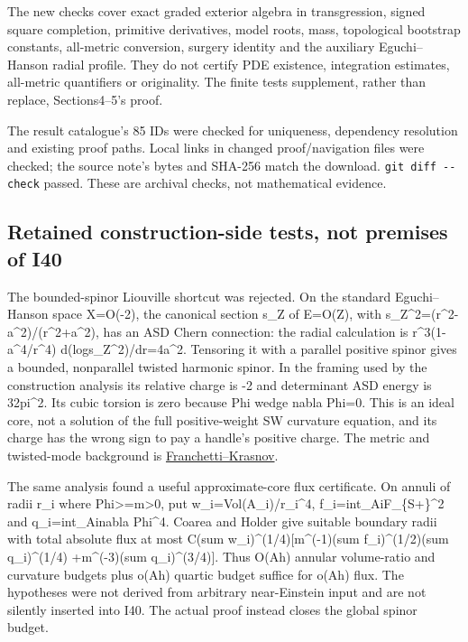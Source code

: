 \documentclass[
  10pt,
]{article}
\begin{document}
The new checks cover exact graded exterior algebra in transgression,
signed square completion, primitive derivatives, model roots, mass,
topological bootstrap constants, all-metric conversion, surgery identity
and the auxiliary Eguchi--Hanson radial profile. They do not certify PDE
existence, integration estimates, all-metric quantifiers or originality.
The finite tests supplement, rather than replace, Sections4--5's proof.

The result catalogue's 85 IDs were checked for uniqueness, dependency
resolution and existing proof paths. Local links in changed
proof/navigation files were checked; the source note's bytes and SHA-256
match the download. \texttt{git\ diff\ -\/-check} passed. These are
archival checks, not mathematical evidence.

\hypertarget{retained-construction-side-tests-not-premises-of-i40}{%
\subsection{Retained construction-side tests, not premises of
I40}\label{retained-construction-side-tests-not-premises-of-i40}}

The bounded-spinor Liouville shortcut was rejected. On the standard
Eguchi--Hanson space X=O(-2), the canonical section s\_Z of E=O(Z), with
\textbar s\_Z\textbar\^{}2=(r\^{}2-a\^{}2)/(r\^{}2+a\^{}2), has an ASD
Chern connection: the radial calculation is r\^{}3(1-a\^{}4/r\^{}4)
d(log\textbar s\_Z\textbar\^{}2)/dr=4a\^{}2. Tensoring it with a
parallel positive spinor gives a bounded, nonparallel twisted harmonic
spinor. In the framing used by the construction analysis its relative
charge is -2 and determinant ASD energy is 32pi\^{}2. Its cubic torsion
is zero because Phi wedge nabla Phi=0. This is an ideal core, not a
solution of the full positive-weight SW curvature equation, and its
charge has the wrong sign to pay a handle's positive charge. The metric
and twisted-mode background is
\href{https://arxiv.org/abs/2309.08453}{Franchetti--Krasnov}.

The same analysis found a useful approximate-core flux certificate. On
annuli of radii r\_i where
\textbar Phi\textbar\textgreater=m\textgreater0, put
w\_i=Vol(A\_i)/r\_i\^{}4, f\_i=int\_Ai\textbar F\_\{S+\}\textbar\^{}2
and q\_i=int\_Ai\textbar nabla Phi\textbar\^{}4. Coarea and Holder give
suitable boundary radii with total absolute flux at most C(sum
w\_i)\^{}(1/4){[}m\^{}(-1)(sum f\_i)\^{}(1/2)(sum q\_i)\^{}(1/4)
+m\^{}(-3)(sum q\_i)\^{}(3/4){]}. Thus O(Ah) annular volume-ratio and
curvature budgets plus o(Ah) quartic budget suffice for o(Ah) flux. The
hypotheses were not derived from arbitrary near-Einstein input and are
not silently inserted into I40. The actual proof instead closes the
global spinor budget.
\end{document}
